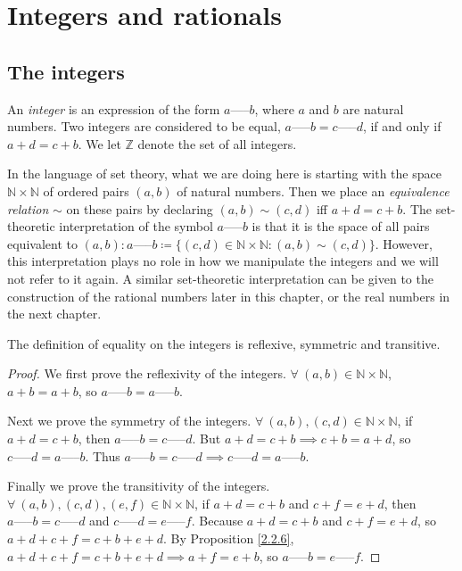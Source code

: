 \chapter{Integers and rationals}
\section{The integers}

\begin{definition}[Integers]\label{4.1.1}
An \emph{integer} is an expression of the form \(a \text{-----} b\), where \(a\) and \(b\) are natural numbers.
Two integers are considered to be equal, \(a \text{-----} b = c \text{-----} d\), if and only if \(a + d = c + b\).
We let \(\mathds{Z}\) denote the set of all integers.
\end{definition}

In the language of set theory, what we are doing here is starting with the space \(\mathds{N} \times \mathds{N}\) of ordered pairs \((a, b)\) of natural numbers.
Then we place an \emph{equivalence relation} \(\sim\) on these pairs by declaring \((a, b) \sim (c, d)\) iff \(a + d = c + b\).
The set-theoretic interpretation of the symbol \(a \text{-----} b\) is that it is the space of all pairs equivalent to \((a, b): a \text{-----} b \coloneqq \{(c, d) \in \mathds{N} \times \mathds{N} : (a, b) \sim (c, d)\}\).
However, this interpretation plays no role in how we manipulate the integers and we will not refer to it again.
A similar set-theoretic interpretation can be given to the construction of the rational numbers later in this chapter, or the real numbers in the next chapter.

\begin{additional corollary}\label{ac 4.1.1}
The definition of equality on the integers is reflexive, symmetric and transitive.
\end{additional corollary}

\begin{proof}
We first prove the reflexivity of the integers.
\(\forall\ (a, b) \in \mathds{N} \times \mathds{N}\), \(a + b = a + b\), so \(a \text{-----} b = a \text{-----} b\).

Next we prove the symmetry of the integers.
\(\forall\ (a, b), (c, d) \in \mathds{N} \times \mathds{N}\), if \(a + d = c + b\), then \(a \text{-----} b = c \text{-----} d\).
But \(a + d = c + b \implies c + b = a + d\), so \(c \text{-----} d = a \text{-----} b\).
Thus \(a \text{-----} b = c \text{-----} d \implies c \text{-----} d = a \text{-----} b\).

Finally we prove the transitivity of the integers.
\(\forall\ (a, b), (c, d), (e, f) \in \mathds{N} \times \mathds{N}\), if \(a + d = c + b\) and \(c + f = e + d\), then \(a \text{-----} b = c \text{-----} d\) and \(c \text{-----} d = e \text{-----} f\).
Because \(a + d = c + b\) and \(c + f = e + d\), so \(a + d + c + f = c + b + e + d\).
By Proposition \ref{2.2.6}, \(a + d + c + f = c + b + e + d \implies a + f = e + b\), so \(a \text{-----} b = e \text{-----} f\).
\end{proof}

